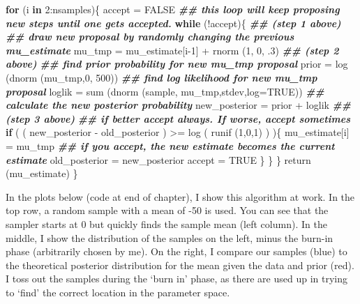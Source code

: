 \documentclass[
]{book}
\newenvironment{Shaded}{\begin{snugshade}}{\end{snugshade}}
\newcommand{\AttributeTok}[1]{\textcolor[rgb]{0.77,0.63,0.00}{#1}}
\newcommand{\ConstantTok}[1]{\textcolor[rgb]{0.00,0.00,0.00}{#1}}
\newcommand{\ControlFlowTok}[1]{\textcolor[rgb]{0.13,0.29,0.53}{\textbf{#1}}}
\newcommand{\DecValTok}[1]{\textcolor[rgb]{0.00,0.00,0.81}{#1}}
\newcommand{\DocumentationTok}[1]{\textcolor[rgb]{0.56,0.35,0.01}{\textbf{\textit{#1}}}}
\newcommand{\FunctionTok}[1]{\textcolor[rgb]{0.00,0.00,0.00}{#1}}
\newcommand{\NormalTok}[1]{#1}
\newcommand{\OtherTok}[1]{\textcolor[rgb]{0.56,0.35,0.01}{#1}}
\newcommand{\SpecialCharTok}[1]{\textcolor[rgb]{0.00,0.00,0.00}{#1}}
\begin{document}
\begin{Shaded}
\begin{Highlighting}[]
  \ControlFlowTok{for}\NormalTok{ (i }\ControlFlowTok{in} \DecValTok{2}\SpecialCharTok{:}\NormalTok{nsamples)\{}
\NormalTok{    accept }\OtherTok{=} \ConstantTok{FALSE}
    \DocumentationTok{\#\# this loop will keep proposing new steps until one gets accepted. }
    \ControlFlowTok{while}\NormalTok{ (}\SpecialCharTok{!}\NormalTok{accept)\{}
      \DocumentationTok{\#\# (step 1 above)}
      \DocumentationTok{\#\# draw new proposal by randomly changing the previous mu\_estimate}
\NormalTok{      mu\_tmp }\OtherTok{=}\NormalTok{ mu\_estimate[i}\DecValTok{{-}1}\NormalTok{] }\SpecialCharTok{+} \FunctionTok{rnorm}\NormalTok{ (}\DecValTok{1}\NormalTok{, }\DecValTok{0}\NormalTok{, .}\DecValTok{3}\NormalTok{)}
      \DocumentationTok{\#\# (step 2 above)}
      \DocumentationTok{\#\# find prior probability for new mu\_tmp proposal}
\NormalTok{      prior }\OtherTok{=} \FunctionTok{log}\NormalTok{ (}\FunctionTok{dnorm}\NormalTok{ (mu\_tmp,}\DecValTok{0}\NormalTok{, }\DecValTok{500}\NormalTok{))}
      \DocumentationTok{\#\# find log likelihood for new mu\_tmp proposal}
\NormalTok{      loglik }\OtherTok{=} \FunctionTok{sum}\NormalTok{ (}\FunctionTok{dnorm}\NormalTok{ (sample, mu\_tmp,stdev,}\AttributeTok{log=}\ConstantTok{TRUE}\NormalTok{))}
      \DocumentationTok{\#\# calculate the new posterior probability}
\NormalTok{      new\_posterior }\OtherTok{=}\NormalTok{ prior }\SpecialCharTok{+}\NormalTok{ loglik}
      \DocumentationTok{\#\# (step 3 above)}
      \DocumentationTok{\#\# if better accept always. If worse, accept sometimes}
      \ControlFlowTok{if}\NormalTok{ ( ( new\_posterior }\SpecialCharTok{{-}}\NormalTok{ old\_posterior ) }\SpecialCharTok{\textgreater{}=} \FunctionTok{log}\NormalTok{ ( }\FunctionTok{runif}\NormalTok{ (}\DecValTok{1}\NormalTok{,}\DecValTok{0}\NormalTok{,}\DecValTok{1}\NormalTok{) ) )\{}
\NormalTok{        mu\_estimate[i] }\OtherTok{=}\NormalTok{ mu\_tmp}
        \DocumentationTok{\#\# if you accept, the new estimate becomes the current estimate}
\NormalTok{        old\_posterior }\OtherTok{=}\NormalTok{ new\_posterior}
\NormalTok{        accept }\OtherTok{=} \ConstantTok{TRUE}
\NormalTok{      \}}
\NormalTok{    \}}
\NormalTok{  \} }
  \FunctionTok{return}\NormalTok{ (mu\_estimate)}
\NormalTok{\}}
\end{Highlighting}
\end{Shaded}

In the plots below (code at end of chapter), I show this algorithm at work. In the top row, a random sample with a mean of -50 is used. You can see that the sampler starts at 0 but quickly finds the sample mean (left column). In the middle, I show the distribution of the samples on the left, minus the burn-in phase (arbitrarily chosen by me). On the right, I compare our samples (blue) to the theoretical posterior distribution for the mean given the data and prior (red). I toss out the samples during the `burn in' phase, as there are used up in trying to `find' the correct location in the parameter space.
\end{document}
